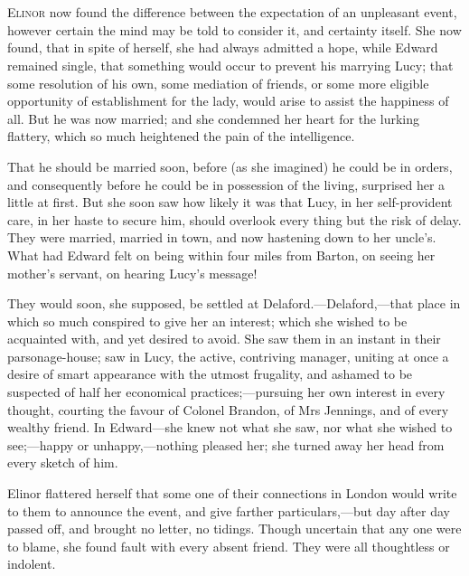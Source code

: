 \chapter[Chapter \thechapter]{}
\lettrine[lines=4,lraise=0.3]{E}{linor} now found the difference between the expectation of an unpleasant event, however certain the mind may be told to consider it, and certainty itself. She now found, that in spite of herself, she had always admitted a hope, while Edward remained single, that something would occur to prevent his marrying Lucy; that some resolution of his own, some mediation of friends, or some more eligible opportunity of establishment for the lady, would arise to assist the happiness of all. But he was now married; and she condemned her heart for the lurking flattery, which so much heightened the pain of the intelligence.

That he should be married soon, before (as she imagined) he could be in orders, and consequently before he could be in possession of the living, surprised her a little at first. But she soon saw how likely it was that Lucy, in her self-provident care, in her haste to secure him, should overlook every thing but the risk of delay. They were married, married in town, and now hastening down to her uncle’s. What had Edward felt on being within four miles from Barton, on seeing her mother’s servant, on hearing Lucy’s message!

They would soon, she supposed, be settled at Delaford.—Delaford,—that place in which so much conspired to give her an interest; which she wished to be acquainted with, and yet desired to avoid. She saw them in an instant in their parsonage-house; saw in Lucy, the active, contriving manager, uniting at once a desire of smart appearance with the utmost frugality, and ashamed to be suspected of half her economical practices;—pursuing her own interest in every thought, courting the favour of Colonel Brandon, of Mrs Jennings, and of every wealthy friend. In Edward—she knew not what she saw, nor what she wished to see;—happy or unhappy,—nothing pleased her; she turned away her head from every sketch of him.

Elinor flattered herself that some one of their connections in London would write to them to announce the event, and give farther particulars,—but day after day passed off, and brought no letter, no tidings. Though uncertain that any one were to blame, she found fault with every absent friend. They were all thoughtless or indolent.

